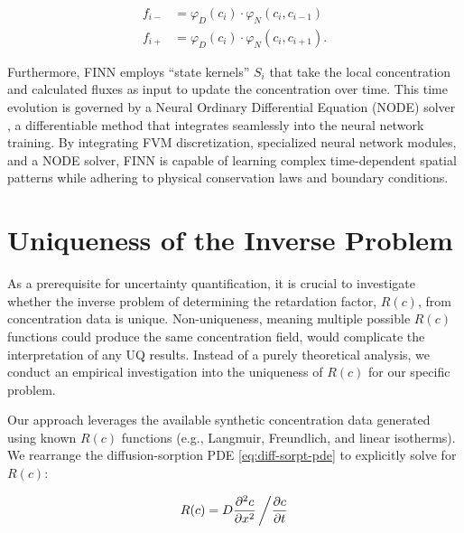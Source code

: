 \begin{align*}
    f_{i-} &= \varphi_D(c_i) \cdot \varphi_N(c_i, c_{i-1}) \\
    f_{i+} &= \varphi_D(c_i) \cdot \varphi_N(c_i, c_{i+1}).
\end{align*}

Furthermore, FINN employs ``state kernels'' $S_i$ that take the local concentration and calculated fluxes as input to update the concentration over time. This time evolution is governed by a Neural Ordinary Differential Equation (NODE) solver \cite{chen2019neuralordinarydifferentialequations}, a differentiable method that integrates seamlessly into the neural network training. By integrating FVM discretization, specialized neural network modules, and a NODE solver, FINN is capable of learning complex time-dependent spatial patterns while adhering to physical conservation laws and boundary conditions.



\section{Uniqueness of the Inverse Problem}
\label{sec:uniqueness}

As a prerequisite for uncertainty quantification, it is crucial to investigate whether the inverse problem of determining the retardation factor, $R(c)$, from concentration data is unique. Non-uniqueness, meaning multiple possible $R(c)$ functions could produce the same concentration field, would complicate the interpretation of any UQ results. Instead of a purely theoretical analysis, we conduct an empirical investigation into the uniqueness of $R(c)$ for our specific problem.

Our approach leverages the available synthetic concentration data generated using known $R(c)$ functions (e.g., Langmuir, Freundlich, and linear isotherms). We rearrange the diffusion-sorption PDE \ref{eq:diff-sorpt-pde} to explicitly solve for $R(c)$:

\begin{equation}
    R(c) = D \frac{\partial^2 c}{\partial x^2} \left/ \frac{\partial c}{\partial t} \right .
    \label{eq:rearranged_pde}
\end{equation}

